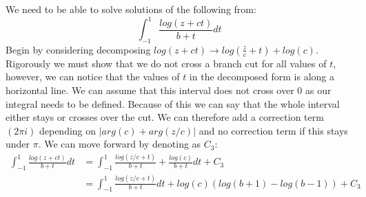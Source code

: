 \documentclass{article}
\begin{document}
We need to be able to solve solutions of the following from:
$$\int_{-1}^1\frac{log(z+ct)}{b+t}dt$$
Begin by considering decomposing $log(z+ct)\rightarrow log(\frac{z}{c}+t)+log(c)$.
Rigorously we must show that we do not cross a branch cut for all values of $t$, however, we can notice that the values of $t$ in the decomposed form is along a horizontal line.
We can assume that this interval does not cross over $0$ as our integral needs to be defined.
Because of this we can say that the whole interval either stays or crosses over the cut.
We can therefore add a correction term $(2\pi i)$ depending on $|arg(c)+arg(z/c)|$ and no correction term if this stays under $\pi$.
We can move forward by denoting as $C_3$:
\begin{align}
    \int_{-1}^1\frac{log(z+ct)}{b+t}dt&=\int_{-1}^1\frac{log(z/c+t)}{b+t}+\frac{log(c)}{b+t}dt+C_3\\
    &=\int_{-1}^1\frac{log(z/c+t)}{b+t}dt+log(c)(log(b+1)-log(b-1))+C_3
\end{align}
\end{document}

